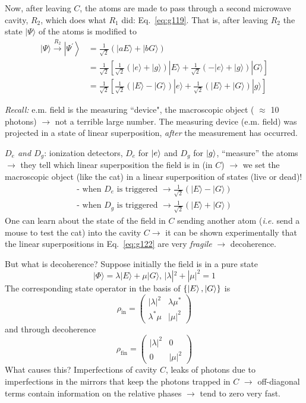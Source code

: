 \documentclass[12pt]{article}
\newcommand{\be}{\begin{equation}}
\newcommand{\ee}{\end{equation}}
\begin{document}

Now, after leaving \(C\), the atoms are made to pass through
a second microwave cavity, \(R_{2}\), which does what
\(R_{1}\) did: Eq.~\eqref{eq:g119}. That is, after leaving \(R_{2}\)
the state \(|\Psi\rangle\) of the atoms is modified to
\be
\begin{aligned}
|\Psi\rangle \stackrel{R_{2}}{\longrightarrow}\left|\Psi^{\prime}\right\rangle 
&=\frac{1}{\sqrt{2}}(|a E\rangle+|b G\rangle) \\ 
&=\frac{1}{\sqrt{2}}\left[\frac{1}{\sqrt{2}}(|e\rangle+|g\rangle)|E\rangle+\frac{1}{\sqrt{2}}(-|e\rangle+|g\rangle)|G\rangle\right] \\ 
&=\frac{1}{\sqrt{2}}\left[\frac{1}{\sqrt{2}}(|E\rangle-|G\rangle)|e\rangle+\frac{1}{\sqrt{2}}(|E\rangle+|G\rangle)|g\rangle\right] \end{aligned}
\ee

\emph{Recall:} \mbox{e.m.} field is the measuring
``device", the macroscopic object ( \(\approx\) 10 photons)
$\rightarrow$ not a terrible large number.
The measuring device (\mbox{e.m.} field)
was projected in a state of linear
superposition, \emph{after} the measurement
has occurred.

\emph{\(D_{e}\) and \(D_{g}\)}: ionization detectors, 
\(D_{e}\) for $\ket{e}$ and 
\(D_{g}\) for $\ket{g}$,
``measure'' the atoms \(\rightarrow\) they tell which
linear superposition the field is in (in $C$) $\rightarrow$ 
we set the macroscopic object (like the cat) 
in a linear superposition of states (live or dead)!
\be
\begin{gathered}
\text {- when } D_{e} \text { is triggered } \rightarrow \frac{1}{\sqrt{2}}
\left(|E\rangle-|G\rangle\right) \\ 
\text {- when } D_{g} \text { is triggered } \rightarrow \frac{1}{\sqrt{2}}
\left(|E\rangle+|G\rangle\right)
\end{gathered}
\label{eq:g122}
\ee
One can learn about the state of the field in $C$
sending another atom (\textit{i.e.} send a mouse to test the cat) into
the cavity \(C\)$\rightarrow$ it can be shown experimentally that
the linear superpositions in Eq.~\eqref{eq:g122} are
very \emph{fragile} \(\rightarrow\) decoherence.

But what is decoherence? 
Suppose initially the field is in a pure state
\be
|\Phi\rangle=\lambda|E\rangle+\mu|G\rangle,\,|\lambda|^{2}+|\mu|^{2}=1
\ee
The corresponding state operator in the basis of $\{\ket{E},\ket{G}\}$ is
\be
\rho_{\text{in}}=\begin{pmatrix}|\lambda|^{2} & \lambda \mu^{*} \\ \lambda^{*} \mu & |\mu|^{2}\end{pmatrix}
\ee
and through decoherence
\be
\rho_{\text{fin}}=\begin{pmatrix}|\lambda|^{2} & 0 \\ 0 & |\mu|^{2}\end{pmatrix}
\ee
What causes this? Imperfections of cavity $C$, leaks
of photons due to imperfections in the mirrors that
keep the photons trapped in $C$ $\rightarrow$
off-diagonal terms contain information
on the relative phases \(\rightarrow\) tend to zero
very fast.
\end{document}
